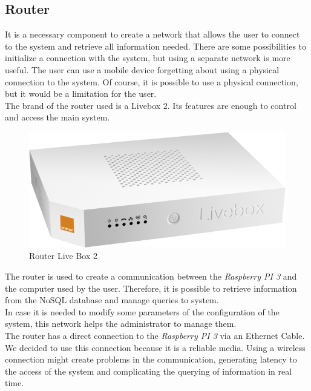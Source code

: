 \subsection{Router}

It is a necessary component to create a network that allows the user to connect to the system and retrieve all information needed. There are some possibilities to initialize a connection with the system, but using a separate network is more useful. The user can use a mobile device forgetting about using a physical connection to the system. Of course, it is possible to use a physical connection, but it would be a limitation for the user.\\

The brand of the router used is a Livebox 2. Its features are enough to control and access the main system.\\

\begin{figure}[H]
\begin{centering}
\includegraphics[scale=0.3]{IMGS/LIVE_BOX_2.png}
\caption{Router Live Box 2 \label{Live_Box2}}
\end{centering}
\end{figure}

The router is used to create a communication between the \textit{Raspberry PI 3} and the computer used by the user. Therefore, it is possible to retrieve information from the NoSQL database and manage queries to system.\\

In case it is needed to modify some parameters of the configuration of the system, this network helps the administrator to manage them.\\

The router has a direct connection to the \textit{Raspberry PI 3} via an Ethernet Cable. We decided to use this connection because it is a reliable media. Using a wireless connection might create problems in the communication, generating latency to the access of the system and complicating the querying of information in real time.

